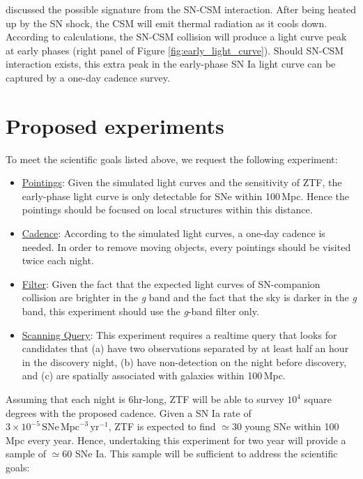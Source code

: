 \documentclass[11pt]{article}
\begin{document}
\citet{2016ApJ...826...96P} discussed the possible signature from the
SN-CSM interaction. After being heated up by the SN shock, the CSM
will emit thermal radiation as it cools down. According to
calculations, the SN-CSM collision will produce a light curve peak at
early phases (right panel of Figure
\ref{fig:early_light_curve}). Should SN-CSM interaction exists, this
extra peak in the early-phase SN Ia light curve can be captured by a
one-day cadence survey.


\section{Proposed experiments}
\label{sec:proposed_experiments}

To meet the scientific goals listed above, we request the following
experiment:
\begin{itemize}
\item \underline{Pointings}: Given the simulated light curves and the
  sensitivity of ZTF, the early-phase light curve is only detectable
  for SNe within 100\,Mpc.  Hence the pointings should be focused on
  local structures within this distance.
\item \underline{Cadence}: According to the simulated light curves, a
  one-day cadence is needed. In order to remove moving objects, every
  pointings should be visited twice each night.
\item \underline{Filter}: Given the fact that the expected light
  curves of SN-companion collision are brighter in the \textit{g} band
  and the fact that the sky is darker in the \textit{g} band, this
  experiment should use the \textit{g}-band filter only.
\item \underline{Scanning Query}: This experiment requires a realtime
  query that looks for candidates that (a) have two observations
  separated by at least half an hour in the discovery night, (b) have
  non-detection on the night before discovery, and (c) are spatially
  associated with galaxies within 100\,Mpc.
\end{itemize}
Assuming that each night is 6hr-long, ZTF will be able to survey
$10^4$ square degrees with the proposed cadence. Given a SN Ia rate of
$3\times10^{-5}\,\textrm{SNe}\,\textrm{Mpc}^{-3}\,\textrm{yr}^{-1}$,
ZTF is expected to find $\simeq30$ young SNe within 100\,Mpc every
year.  Hence, undertaking this experiment for two year will provide a
sample of $\simeq60$ SNe Ia. This sample will be sufficient to address
the scientific goals:
\end{document}
